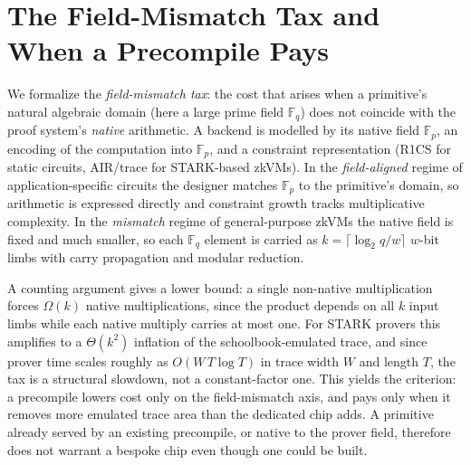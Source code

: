 \section{The Field-Mismatch Tax and When a Precompile Pays}
We formalize the \emph{field-mismatch tax}: the cost that arises when a primitive's natural algebraic domain (here a large prime field $\mathbb{F}_q$) does not coincide with the proof system's \emph{native} arithmetic. A backend is modelled by its native field $\mathbb{F}_p$, an encoding of the computation into $\mathbb{F}_p$, and a constraint representation (R1CS for static circuits, AIR/trace for STARK-based zkVMs). In the \emph{field-aligned} regime of application-specific circuits the designer matches $\mathbb{F}_p$ to the primitive's domain, so arithmetic is expressed directly and constraint growth
tracks multiplicative complexity. In the \emph{mismatch} regime of general-purpose zkVMs the native field is fixed and much smaller, so each $\mathbb{F}_q$ element is carried as $k=\lceil \log_2 q / w\rceil$ $w$-bit limbs with carry propagation and modular reduction.

A counting argument gives a lower bound: a single non-native multiplication forces $\Omega(k)$ native multiplications, since the product depends on all $k$ input limbs while each native multiply carries at most one. For STARK provers this amplifies to a $\Theta(k^2)$ inflation of the schoolbook-emulated trace, and since prover time scales roughly as $O(W\,T\log T)$ in trace width $W$ and length $T$, the tax is a structural slowdown, not a constant-factor one. This yields the criterion: a precompile lowers cost only on the field-mismatch axis, and pays only when it removes more emulated trace area than the dedicated chip adds. A primitive already served by an existing precompile, or native to the prover field, therefore does not warrant a bespoke chip even though one could be built.
